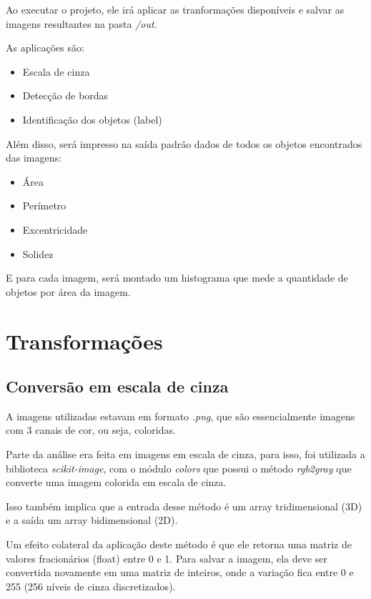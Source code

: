 \documentclass[conference]{IEEEtran}
\begin{document}
        Ao executar o projeto, ele irá aplicar as tranformações disponíveis e salvar as imagens resultantes na pasta \textit{/out}.

        As aplicações são:

        \begin{itemize}
            \item Escala de cinza
            \item Detecção de bordas
            \item Identificação dos objetos (label)
        \end{itemize}

        Além disso, será impresso na saída padrão dados de todos os objetos encontrados das imagens:

        \begin{itemize}
            \item Área
            \item Perímetro
            \item Excentricidade
            \item Solidez
        \end{itemize}

        E para cada imagem, será montado um histograma que mede a quantidade de objetos por área da imagem.

\section{Transformações}

    \subsection{Conversão em escala de cinza}

        A imagens utilizadas estavam em formato \textit{.png}, que são essencialmente imagens com 3 canais de cor, ou seja, coloridas.

        Parte da análise era feita em imagens em escala de cinza, para isso, foi utilizada a biblioteca \textit{scikit-image}, com o módulo \textit{colors} que possui o método \textit{rgb2gray} que converte uma imagem colorida em escala de cinza.

        Isso também implica que a entrada desse método é um array tridimensional (3D) e a saída um array bidimensional (2D).

        Um efeito colateral da aplicação deste método é que ele retorna uma matriz de valores fracionários (float) entre 0 e 1. Para salvar a imagem, ela deve ser convertida novamente em uma matriz de inteiros, onde a variação fica entre 0 e 255 (256 níveis de cinza discretizados).
\end{document}
